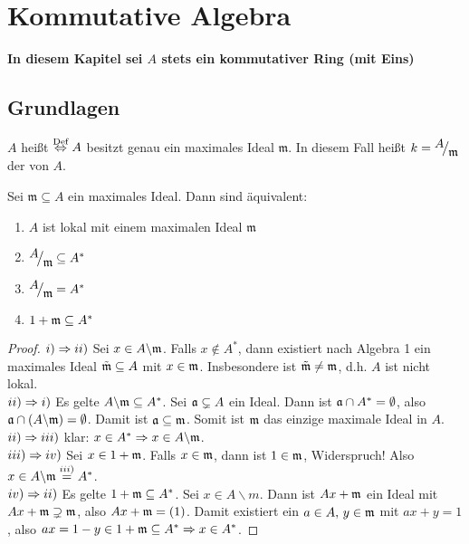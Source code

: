 \newpage
\section{Kommutative Algebra}
\begin{center}
	\textbf{In diesem Kapitel sei $A$ stets ein kommutativer Ring (mit Eins)}
\end{center}
\setcounter{subsection}{10}
\subsection{Grundlagen}
\begin{df}\label{11.1}
	$A$ heißt  $\overset{\text{Def}}{\Leftrightarrow} A$ besitzt genau ein maximales Ideal $\mathfrak{m}$. In diesem Fall heißt $k= \QR{A}{\mathfrak{m}}$ der  von $A$.
\end{df}
\begin{bem}\label{11.2}
	Sei $\mathfrak{m}\subseteq A$ ein maximales Ideal. Dann sind äquivalent:
	\begin{enumerate}[label= \roman*)]
		\item $A$ ist lokal mit einem maximalen Ideal $\mathfrak{m}$
		\item $\QR{A}{\mathfrak{m}} \subseteq A^*$
		\item $\QR{A}{\m} = A^*$
		\item $1+ \mathfrak{m} \subseteq A^*$
	\end{enumerate}
\end{bem}
\begin{proof}
	$i) \Rightarrow ii)$ Sei $x\in A\backslash \mathfrak{m}$. Falls $x\notin A^*$, dann existiert nach Algebra 1 ein maximales Ideal $\tilde{\mathfrak{m}} \subseteq A$ mit $x\in \mathfrak{m}$. Insbesondere ist $\tilde{\mathfrak{m}} \neq \mathfrak{m}$, d.h. $A$ ist nicht lokal.\\
	$ii) \Rightarrow i)$ Es gelte $A\backslash \mathfrak{m} \subseteq A^*$. Sei $\mathfrak{a}\subsetneq A$ ein Ideal. Dann ist $\mathfrak{a} \cap A^*= \emptyset$, also $\mathfrak{a} \cap (A\backslash \mathfrak{m}) = \emptyset$. Damit ist $\mathfrak{a} \subseteq \mathfrak{m}$. Somit ist $\mathfrak{m}$ das einzige maximale Ideal in $A$.\\
	$ii) \Rightarrow iii)$ klar: $x\in A^* \Rightarrow x\in A \backslash \mathfrak{m}$.\\
	$iii) \Rightarrow iv)$ Sei $x\in 1+ \mathfrak{m}$. Falls $x\in \mathfrak{m}$, dann ist $1\in \mathfrak{m}$, Widerspruch! Also $x\in A \backslash \mathfrak{m} \overset{iii)}{=} A^*$.\\
	$iv) \Rightarrow ii)$ Es gelte $1+ \mathfrak{m} \subseteq A^*$. Sei $x\in A \backslash m$. Dann ist $Ax+ \mathfrak{m}$ ein Ideal mit $Ax+ \mathfrak{m} \supsetneq \mathfrak{m}$, also $Ax+ \mathfrak{m} =(1)$. Damit existiert ein $a\in A, \, y\in \mathfrak{m}$ mit $ax+y =1$, also $ax=1-y\in 1+ \mathfrak{m} \subseteq A^* \Rightarrow x\in A^*$.
\end{proof}
